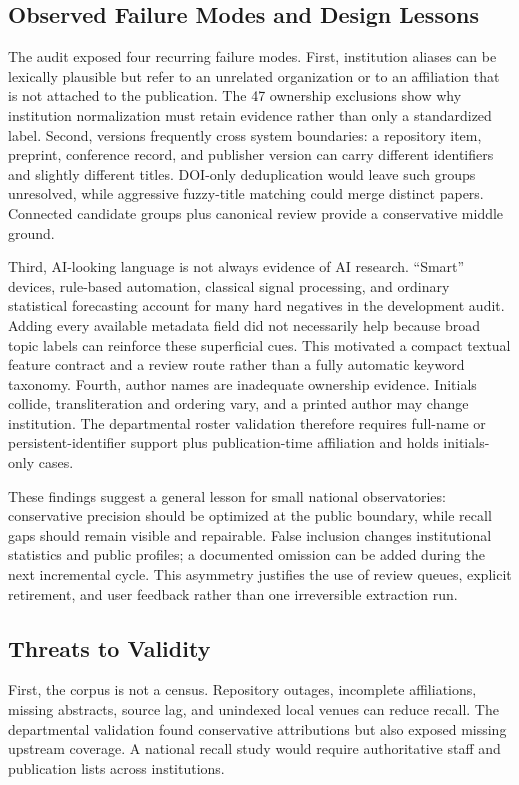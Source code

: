 \documentclass[conference]{IEEEtran}
\begin{document}
\subsection{Observed Failure Modes and Design Lessons}
The audit exposed four recurring failure modes. First, institution aliases can be lexically plausible but refer to an unrelated organization or to an affiliation that is not attached to the publication. The 47 ownership exclusions show why institution normalization must retain evidence rather than only a standardized label. Second, versions frequently cross system boundaries: a repository item, preprint, conference record, and publisher version can carry different identifiers and slightly different titles. DOI-only deduplication would leave such groups unresolved, while aggressive fuzzy-title matching could merge distinct papers. Connected candidate groups plus canonical review provide a conservative middle ground.

Third, AI-looking language is not always evidence of AI research. ``Smart'' devices, rule-based automation, classical signal processing, and ordinary statistical forecasting account for many hard negatives in the development audit. Adding every available metadata field did not necessarily help because broad topic labels can reinforce these superficial cues. This motivated a compact textual feature contract and a review route rather than a fully automatic keyword taxonomy. Fourth, author names are inadequate ownership evidence. Initials collide, transliteration and ordering vary, and a printed author may change institution. The departmental roster validation therefore requires full-name or persistent-identifier support plus publication-time affiliation and holds initials-only cases.

These findings suggest a general lesson for small national observatories: conservative precision should be optimized at the public boundary, while recall gaps should remain visible and repairable. False inclusion changes institutional statistics and public profiles; a documented omission can be added during the next incremental cycle. This asymmetry justifies the use of review queues, explicit retirement, and user feedback rather than one irreversible extraction run.

\subsection{Threats to Validity}
First, the corpus is not a census. Repository outages, incomplete affiliations, missing abstracts, source lag, and unindexed local venues can reduce recall. The departmental validation found conservative attributions but also exposed missing upstream coverage. A national recall study would require authoritative staff and publication lists across institutions.
\end{document}
